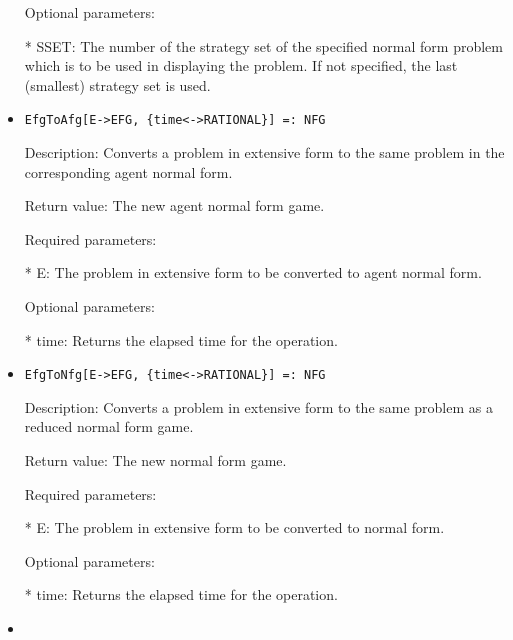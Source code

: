 \begin{itemize}
\item
[Optional parameters:]\hfil\null	

\bd
\item
[* SSET:] The number of the strategy set of the specified normal form
problem which is to be used in displaying the problem.  If not
specified, the last (smallest) strategy set is used.
\ed
\ed

\item
\begin{verbatim}
EfgToAfg[E->EFG, {time<->RATIONAL}] =: NFG
\end{verbatim}

\bd
\item
[Description:] Converts a problem in extensive form to the same problem
in the corresponding agent normal form.
\item
[Return value:] The new agent normal form game.  
\item 
[Required parameters:]\hfil\null

\bd
\item
[* E:] The problem in extensive form to be converted to agent normal form.
\ed

\item
[Optional parameters:]\hfil\null
	
\bd
\item
[* time:] Returns the elapsed time for the operation.
\ed
\ed

\item
\begin{verbatim}
EfgToNfg[E->EFG, {time<->RATIONAL}] =: NFG
\end{verbatim}

\bd
\item
[Description:] Converts a problem in extensive form to the same problem
as a reduced normal form game.
\item
[Return value:] The new normal form game.  
\item
[Required parameters:]\hfil\null
	
\bd
\item
[* E:] The problem in extensive form to be converted to normal form.
\ed

\item
[Optional parameters:]\hfil\null
	
\bd
\item
[* time:] Returns the elapsed time for the operation.
\ed
\ed

\item


\end{itemize}
